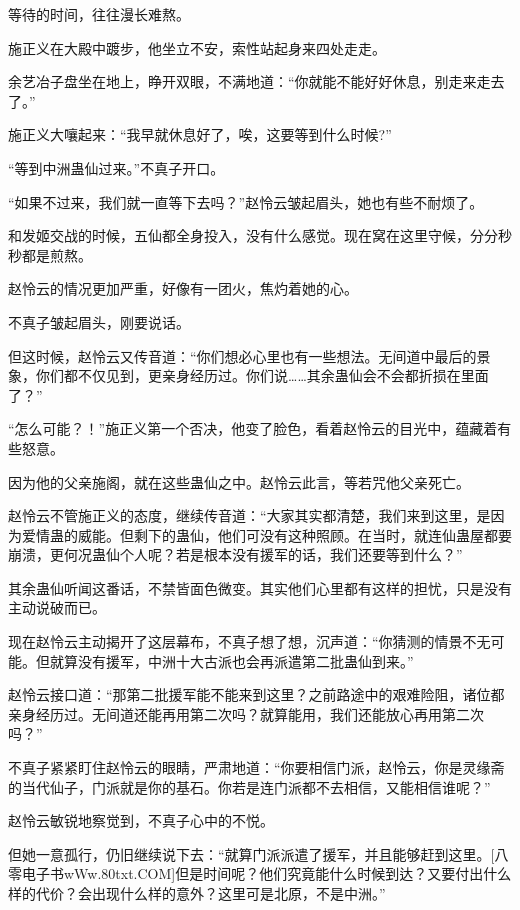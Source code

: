 
\begin{this_body}

等待的时间，往往漫长难熬。

施正义在大殿中踱步，他坐立不安，索性站起身来四处走走。

余艺冶子盘坐在地上，睁开双眼，不满地道：“你就能不能好好休息，别走来走去了。”

施正义大嚷起来：“我早就休息好了，唉，这要等到什么时候?”

“等到中洲蛊仙过来。”不真子开口。

“如果不过来，我们就一直等下去吗？”赵怜云皱起眉头，她也有些不耐烦了。

和发姬交战的时候，五仙都全身投入，没有什么感觉。现在窝在这里守候，分分秒秒都是煎熬。

赵怜云的情况更加严重，好像有一团火，焦灼着她的心。

不真子皱起眉头，刚要说话。

但这时候，赵怜云又传音道：“你们想必心里也有一些想法。无间道中最后的景象，你们都不仅见到，更亲身经历过。你们说……其余蛊仙会不会都折损在里面了？”

“怎么可能？！”施正义第一个否决，他变了脸色，看着赵怜云的目光中，蕴藏着有些怒意。

因为他的父亲施阁，就在这些蛊仙之中。赵怜云此言，等若咒他父亲死亡。

赵怜云不管施正义的态度，继续传音道：“大家其实都清楚，我们来到这里，是因为爱情蛊的威能。但剩下的蛊仙，他们可没有这种照顾。在当时，就连仙蛊屋都要崩溃，更何况蛊仙个人呢？若是根本没有援军的话，我们还要等到什么？”

其余蛊仙听闻这番话，不禁皆面色微变。其实他们心里都有这样的担忧，只是没有主动说破而已。

现在赵怜云主动揭开了这层幕布，不真子想了想，沉声道：“你猜测的情景不无可能。但就算没有援军，中洲十大古派也会再派遣第二批蛊仙到来。”

赵怜云接口道：“那第二批援军能不能来到这里？之前路途中的艰难险阻，诸位都亲身经历过。无间道还能再用第二次吗？就算能用，我们还能放心再用第二次吗？”

不真子紧紧盯住赵怜云的眼睛，严肃地道：“你要相信门派，赵怜云，你是灵缘斋的当代仙子，门派就是你的基石。你若是连门派都不去相信，又能相信谁呢？”

赵怜云敏锐地察觉到，不真子心中的不悦。

但她一意孤行，仍旧继续说下去：“就算门派派遣了援军，并且能够赶到这里。[八零电子书wWw.80txt.COM]但是时间呢？他们究竟能什么时候到达？又要付出什么样的代价？会出现什么样的意外？这里可是北原，不是中洲。”


\end{this_body}
